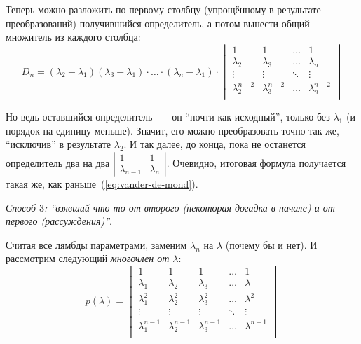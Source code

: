 \documentclass[a4paper,12pt]{article}
\theoremstyle{remark}
\begin{document}
\begin{solution}
    Теперь можно разложить по первому столбцу (упрощённому в результате преобразований) получившийся определитель, а потом вынести общий множитель из каждого столбца:
    \[
      D_n = (\lambda_2 - \lambda_1) (\lambda_3 - \lambda_1) \cdot \ldots \cdot (\lambda_n - \lambda_1) \cdot \begin{vmatrix}
        1               & 1               & \ldots & 1\\
        \lambda_2       & \lambda_3       & \ldots & \lambda_n\\
        \vdots          & \vdots          & \ddots & \vdots\\
        \lambda_2^{n-2} & \lambda_3^{n-2} & \ldots & \lambda_n^{n-2}\\
      \end{vmatrix}
    \]
    
    Но ведь оставшийся определитель~---~он ``почти как исходный'', только без $\lambda_1$ (и порядок на единицу меньше).
    Значит, его можно преобразовать точно так же, ``исключив'' в результате $\lambda_2$.
    И так далее, до конца, пока не останется определитель два на два $\left|\begin{smallmatrix} 1 & 1 \\ \lambda_{n-1} & \lambda_n \end{smallmatrix}\right|$.
    Очевидно, итоговая формула получается такая же, как раньше~(\ref{eq:vander-de-mond}).
    
    \medskip
    
    \emph{Способ $3$: ``взявший что-то от второго (некоторая догадка в начале) и от первого (рассуждения)''}.
    
    Считая все лямбды параметрами, заменим $\lambda_n$ на $\lambda$ (почему бы и нет).
    И рассмотрим следующий \emph{многочлен от $\lambda$}:
    \[
      p(\lambda) = \begin{vmatrix}
        1               & 1               & 1               & \ldots & 1\\
        \lambda_1       & \lambda_2       & \lambda_3       & \ldots & \lambda\\
        \lambda_1^2     & \lambda_2^2     & \lambda_3^2     & \ldots & \lambda^2\\
        \vdots          & \vdots          & \vdots          & \ddots & \vdots\\
        \lambda_1^{n-1} & \lambda_2^{n-1} & \lambda_3^{n-1} & \ldots & \lambda^{n-1}\\
      \end{vmatrix}
    \]
    

\end{solution}
\end{document}
